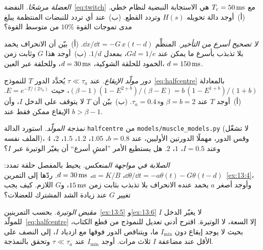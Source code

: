 \begin{exercise}[\lvlB]
\label{ex:13:3}
\emph{العضلة مرشحًا.} النفضة~\eqref{eq:twitch} مع $T_c=50\,\text{ms}$ هي الاستجابة النبضية لنظام خطي. (أ)~أوجد دالة تحويله $H(s)$ وتردد القطع. (ب)~عند أي تردد للنبضات المنتظمة يبلغ مدى تموجات القوة $10\%$ من متوسط القوة؟
\end{exercise}

\begin{exercise}[\lvlB]
\label{ex:13:4}
\emph{لا تصحيح أسرع من التأخير.} المنظِّم $\dd x/\dd t=-G\,x(t-d)$. (أ)~بيّن أن الانحراف يخمد بلا تذبذب بأسرع ما يمكن عند $Gd=1/e$، بمعدل $1/d$. (ب)~أوجد هذا $G$ وثابت زمن الخمود للحلقة الشوكية، $d=30\,\text{ms}$، وللحلقة عبر العين، $d=150\,\text{ms}$.
\end{exercise}

\begin{exercise}[\lvlB]
\label{ex:13:5}
\emph{دور مولّد الإيقاع.} عند $\tau\ll\tau_a$ يُحدَّد الدور $T$ للنموذج~\eqref{eq:halfcentre} بالمعادلة $(\beta-1)(1-E^{2+b})/(\beta-E)=b\,(1-E^{1+b})/(1+b)$، حيث $E=e^{-T/(2\tau_a)}$. (أ)~أوجد $T$ عند $\beta=b=2$ و$\tau_a=0.4\,\text{s}$. (ب)~بيّن أن $T$ لا يتوقف على الدخل $I$، وأن الإيقاع ممكن فقط عند $b>\beta-1$.
\end{exercise}

\begin{exercise}[\lvlB]
\label{ex:13:6}
\emph{نمذجة المولّد.} استورد الدالة \foreignlanguage{english}{\texttt{halfcentre}} من \foreignlanguage{english}{\texttt{models/\allowbreak muscle\_models.py}} (لا تشغّل الملف نفسه)، وقس الدور، مهملًا الدورتين الأوليين، عند $b=0.8$، $1.05$، $1.2$، $1.5$، $2$، $4$ وعند $I=0.5$، $1$، $2$. هل يستطيع الأمر ”امشِ أسرع“ أن يغيّر الوتيرة عبر $I$؟
\end{exercise}

\begin{exercise}[\lvlB]
\label{ex:13:7}
\emph{الصلابة في مواجهة المنعكس.} يحيط بالمفصل حلقة تمدد: $\dd\theta/\dd t=-a\theta(t)-G\theta(t-d)$، $a=K/B$، $d=30\,\text{ms}$. ردّها إلى التمرين~\ref{ex:13:4}، وأوجد أصغر $a$ يخمد عنده الانحراف بلا تذبذب بثابت زمن $15\,\text{ms}$، و$G$ اللازم. كيف يجب تغيير $G$ عند زيادة الشد المشترك للعضلات؟
\end{exercise}

\begin{exercise}[\lvlC]
\label{ex:13:8}
\emph{مقبض الوتيرة.} بحسب التمرينين~\ref{ex:13:5} و\ref{ex:13:6} لا يغيّر الدخل $I$ للمولّد~\eqref{eq:halfcentre} إلا السعة، لا الوتيرة. اقترح أدنى تعديل للنموذج من قطع الكتاب، بحيث لا يوجد إيقاع دون $I_{\min}$ ما، ويتناقص الدور فوقها مع ازدياد $I$، إلى النصف على الأقل عند مضاعفة $I$ ثلاث مرات. أوجد $I_{\min}$ عند $\tau\ll\tau_a$ وتحقق بالنمذجة.
\end{exercise}
